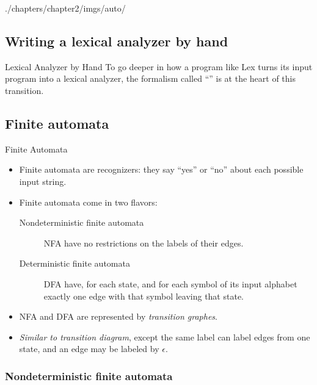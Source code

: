 \begin{graphicspathcontext}{{./chapters/chapter2/imgs/auto/}}
\begin{bibunit}[apalike]
\section[Lexical analyzer by hand]{Writing a lexical analyzer by hand}

\tableofcontentslide[sectionstyle={show/shaded},subsectionstyle={show/show/hide},subsubsectionstyle={hide/hide/hide/hide}]

\begin{frame}{Lexical Analyzer by Hand}
	To go deeper in how a program like Lex turns its input program into a lexical analyzer, the formalism called ``'' is at the heart of this transition.
\end{frame}

\subsection{Finite automata}

\begin{frame}{Finite Automata}
	\begin{itemize}
	\item Finite automata are recognizers: they say ``yes'' or ``no'' about each possible input string.
	\vfill
	\item Finite automata come in two flavors:
		\begin{description}
		\item[Nondeterministic finite automata] NFA have no restrictions on the labels of their edges.
		\item[Deterministic finite automata] DFA have, for each state, and for each symbol of its input alphabet exactly one edge with that symbol leaving that state.
		\end{description}
	\vfill
	\item NFA and DFA are represented by \emph{transition graphes}.
	\item \emph{Similar to transition diagram}, except the same label can label edges from one state, and an edge may be labeled by $\epsilon$.
	\end{itemize}
\end{frame}

\subsubsection{Nondeterministic finite automata}

\tableofcontentslide[sections={1-5},sectionstyle={show/shaded},subsectionstyle={show/shaded/hide},subsubsectionstyle={show/show/hide/hide}]


\end{bibunit}
\end{graphicspathcontext}
